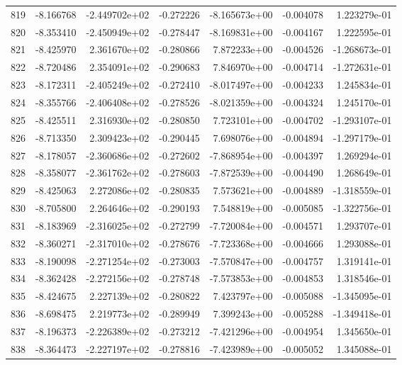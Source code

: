 \begin{tabular}{rrrrrrr}
 819 &  -8.166768 & -2.449702e+02 & -0.272226 & -8.165673e+00 &   -0.004078 &  1.223279e-01 \\
 820 &  -8.353410 & -2.450949e+02 & -0.278447 & -8.169831e+00 &   -0.004167 &  1.222595e-01 \\
 821 &  -8.425970 &  2.361670e+02 & -0.280866 &  7.872233e+00 &   -0.004526 & -1.268673e-01 \\
 822 &  -8.720486 &  2.354091e+02 & -0.290683 &  7.846970e+00 &   -0.004714 & -1.272631e-01 \\
 823 &  -8.172311 & -2.405249e+02 & -0.272410 & -8.017497e+00 &   -0.004233 &  1.245834e-01 \\
 824 &  -8.355766 & -2.406408e+02 & -0.278526 & -8.021359e+00 &   -0.004324 &  1.245170e-01 \\
 825 &  -8.425511 &  2.316930e+02 & -0.280850 &  7.723101e+00 &   -0.004702 & -1.293107e-01 \\
 826 &  -8.713350 &  2.309423e+02 & -0.290445 &  7.698076e+00 &   -0.004894 & -1.297179e-01 \\
 827 &  -8.178057 & -2.360686e+02 & -0.272602 & -7.868954e+00 &   -0.004397 &  1.269294e-01 \\
 828 &  -8.358077 & -2.361762e+02 & -0.278603 & -7.872539e+00 &   -0.004490 &  1.268649e-01 \\
 829 &  -8.425063 &  2.272086e+02 & -0.280835 &  7.573621e+00 &   -0.004889 & -1.318559e-01 \\
 830 &  -8.705800 &  2.264646e+02 & -0.290193 &  7.548819e+00 &   -0.005085 & -1.322756e-01 \\
 831 &  -8.183969 & -2.316025e+02 & -0.272799 & -7.720084e+00 &   -0.004571 &  1.293707e-01 \\
 832 &  -8.360271 & -2.317010e+02 & -0.278676 & -7.723368e+00 &   -0.004666 &  1.293088e-01 \\
 833 &  -8.190098 & -2.271254e+02 & -0.273003 & -7.570847e+00 &   -0.004757 &  1.319141e-01 \\
 834 &  -8.362428 & -2.272156e+02 & -0.278748 & -7.573853e+00 &   -0.004853 &  1.318546e-01 \\
 835 &  -8.424675 &  2.227139e+02 & -0.280822 &  7.423797e+00 &   -0.005088 & -1.345095e-01 \\
 836 &  -8.698475 &  2.219773e+02 & -0.289949 &  7.399243e+00 &   -0.005288 & -1.349418e-01 \\
 837 &  -8.196373 & -2.226389e+02 & -0.273212 & -7.421296e+00 &   -0.004954 &  1.345650e-01 \\
 838 &  -8.364473 & -2.227197e+02 & -0.278816 & -7.423989e+00 &   -0.005052 &  1.345088e-01 \\

\end{tabular}
